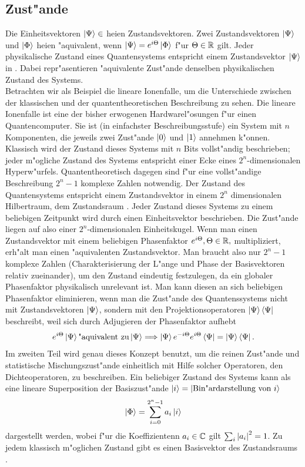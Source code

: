   \subsection{Zust"ande} 
      Die Einheitsvektoren $\left| \Psi \right> \in$ \raum{} hei\3en Zustandsvektoren. Zwei Zustandsvektoren $\left| \Psi \right>$ und $\left| \Phi \right>$ hei\3en "aquivalent, wenn 
      $\left| \Psi \right> = e^{i\Theta}\left| \Phi \right>$ f"ur $\Theta \in \mathbb{R}$ gilt. 
      Jeder physikalische Zustand eines Quantensystems entspricht einem Zustandsvektor $\left| \Psi \right>$ in \raum. Dabei repr"asentieren "aquivalente Zust"ande denselben
      physikalischen Zustand des Systems. \\
      Betrachten wir als Beispiel die lineare Ionenfalle, um die Unterschiede zwischen der klassischen und der quantentheoretischen Beschreibung zu sehen. Die lineare Ionenfalle
      ist eine der bisher
      erwogenen Hardwarel"osungen f"ur einen Quantencomputer. Sie ist (in einfachster Beschreibungsstufe) ein System mit $n$ Komponenten, die jeweils zwei Zust"ande $\left| 0 \right>$ und
      $\left| 1 \right>$ annehmen k"onnen. Klassisch wird der Zustand dieses Systems mit $n$ Bits vollst"andig beschrieben; jeder m"ogliche Zustand des Systems entspricht einer Ecke eines
      $2^n$-dimensionalen Hyperw"urfels. Quantentheoretisch dagegen sind f"ur eine vollst"andige Beschreibung $2^n-1$ komplexe Zahlen notwendig. Der Zustand des Quantensystems
      entspricht einem Zustandsvektor in einem $2^n$ dimensionalen Hilbertraum, dem Zustandsraum \raum. Jeder Zustand dieses Systems zu einem beliebigen Zeitpunkt wird durch einen
      Einheitsvektor
      beschrieben. Die Zust"ande liegen auf also einer $2^n$-dimensionalen Einheitskugel. Wenn man einen Zustandsvektor mit einem beliebigen
      Phasenfaktor $e^{i\Theta}, \Theta \in \mathbb{R},$ multipliziert, erh"alt man einen "aquivalenten Zustandsvektor. Man braucht also nur $2^n-1$ komplexe Zahlen (Charakterisierung
      der L"ange und Phase der Basisvektoren relativ zueinander), um den Zustand eindeutig festzulegen, da ein globaler Phasenfaktor physikalisch unrelevant ist. Man kann diesen
      an sich beliebigen Phasenfaktor eliminieren, wenn man die Zust"ande des Quantenssystems nicht mit Zustandsvektoren $\left| \Psi \right>$, sondern mit den Projektionsoperatoren
      $\left| \Psi \right>\left< \Psi \right|$ beschreibt, weil sich durch Adjugieren der Phasenfaktor aufhebt
      $$ e^{i\Theta}\left| \Psi \right> \mbox{"aquivalent zu} \left| \Psi \right> \Longrightarrow \left| \Psi \right>e^{-i\Theta}e^{i\Theta}\left< \Psi \right| = \left| \Psi \right>\left< \Psi \right|. $$
      Im zweiten Teil wird genau dieses Konzept benutzt, um die reinen Zust"ande und statistische Mischungszust"ande einheitlich mit Hilfe solcher Operatoren, den Dichteoperatoren,
      zu beschreiben. Ein beliebiger Zustand des Systems kann als eine lineare Superposition der Basiszust"ande $\left| i \right> = \left| \mbox{Bin"ardarstellung von $i$} \right>$
      $$ \left| \Phi \right> = \sum_{i=0}^{2^n-1} a_i \left| i \right>$$
      dargestellt werden, wobei f"ur die Koeffizientenn $a_i \in \mathbb{C}$ gilt $\sum_{i} \left| a_i \right|^2 = 1$. Zu jedem klassisch m"oglichen Zustand gibt es
      einen Basisvektor des Zustandsraums \raum. 
